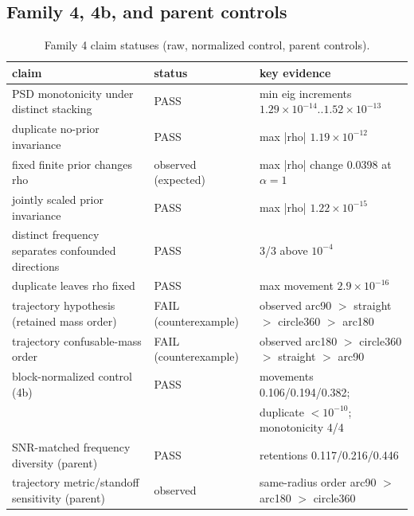\documentclass[12pt]{article}
\begin{document}
\subsection{Family 4, 4b, and parent controls}
\begin{table}[ht]
\centering
\small
\caption{Family 4 claim statuses (raw, normalized control, parent controls).}
\label{app:tab:f4}
\begin{tabular}{p{} p{} p{}}
\toprule
claim & status & key evidence \\
\midrule
PSD monotonicity under distinct stacking & PASS &
min eig increments $1.29\times10^{-14}$..$1.52\times10^{-13}$ \\
duplicate no-prior invariance & PASS & max |rho| $1.19\times10^{-12}$ \\
fixed finite prior changes rho & observed (expected) &
max |rho| change 0.0398 at $\alpha=1$ \\
jointly scaled prior invariance & PASS & max |rho| $1.22\times10^{-15}$ \\
distinct frequency separates confounded directions & PASS &
3/3 above $10^{-4}$ \\
duplicate leaves rho fixed & PASS & max movement $2.9\times10^{-16}$ \\
trajectory hypothesis (retained mass order) & FAIL (counterexample) &
observed arc90 $>$ straight $>$ circle360 $>$ arc180 \\
trajectory confusable-mass order & FAIL (counterexample) &
observed arc180 $>$ circle360 $>$ straight $>$ arc90 \\
block-normalized control (4b) & PASS &
movements 0.106/0.194/0.382; \\
 & & duplicate $<10^{-10}$; monotonicity 4/4 \\
SNR-matched frequency diversity (parent) & PASS &
retentions 0.117/0.216/0.446 \\
trajectory metric/standoff sensitivity (parent) & observed &
same-radius order arc90 $>$ arc180 $>$ circle360 \\
\bottomrule
\end{tabular}
\end{table}
\end{document}
